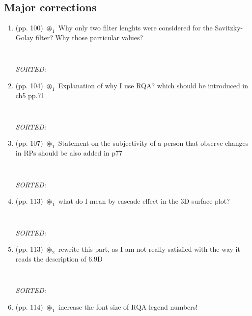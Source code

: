 \documentclass[12pt]{article}
\begin{document}
\subsection{Major corrections}
\begin{enumerate}

\item  (pp. 100) $\circledast_1$ 
	Why only two filter lenghts were considered for 
	the Savitzky-Golay filter?
	Why those particular values?	
	\begin{verbatim}
	
	\end{verbatim}
	\textit{
	SORTED:  
	}
	\\

\item  (pp. 104) $\circledast_1$ 
	Explanation of why I use RQA?
	which should be introduced in ch5 pp.71
	\begin{verbatim}
	
	\end{verbatim}
	\textit{
	SORTED:  
	}
	\\

\item  (pp. 107) $\circledast_1$ 
	Statement on the subjectivity of a person
	that observe changes in RPs should be
	also added in p77
	\begin{verbatim}
	
	\end{verbatim}
	\textit{
	SORTED:  
	}
	\\

\item  (pp. 113) $\circledast_1$ 
	what do I mean by cascade effect in 
	the 3D surface plot?
	\begin{verbatim}
	
	\end{verbatim}
	\textit{
	SORTED:  
	}
	\\


\item  (pp. 113) $\circledast_2$ 
	rewrite this part, as I am not really
	satisfied with the way it reads the description
	of 6.9D
	\begin{verbatim}
	
	\end{verbatim}
	\textit{
	SORTED:  
	}
	\\

\item  (pp. 114) $\circledast_1$ 
	increase the font size of RQA legend numbers!
	\begin{verbatim}
	

\end{verbatim}
\end{enumerate}
\end{document}
